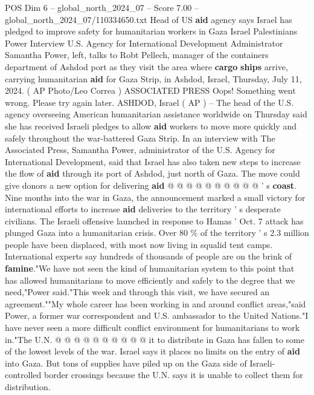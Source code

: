 \begin{textsample}{POS Dim 6 – global\_north\_2024\_07 – Score 7.00 – global\_north\_2024\_07/110334650.txt}  \label{ex:f6_pos_306}
Head of US \textbf{aid} agency says Israel has pledged to improve safety for humanitarian workers in Gaza Israel Palestinians Power Interview U.S.
Agency for International Development Administrator Samantha Power, left, talks to Robt Pellech, manager of the containers department of Ashdod port as they visit the area where \textbf{cargo} \textbf{ships} arrive, carrying humanitarian \textbf{aid} for Gaza Strip, in Ashdod, Israel, Thursday, July 11, 2024. ( AP Photo/Leo Correa ) ASSOCIATED PRESS Oops!
Something went wrong.
Please try again later.
ASHDOD, Israel ( AP ) -- The head of the U.S. agency overseeing American humanitarian assistance worldwide on Thursday said she has received Israeli pledges to allow \textbf{aid} workers to move more quickly and safely throughout the war-battered Gaza Strip.
In an interview with The Associated Press, Samantha Power, administrator of the U.S.
Agency for International Development, said that Israel has also taken new steps to increase the flow of \textbf{aid} through its port of Ashdod, just north of Gaza.
The move could give donors a new option for delivering \textbf{aid} @ @ @ @ @ @ @ @ @ @ ' s \textbf{coast}.
Nine months into the war in Gaza, the announcement marked a small victory for international efforts to increase \textbf{aid} deliveries to the territory ' s desperate civilians.
The Israeli offensive launched in response to Hamas ' Oct. 7 attack has plunged Gaza into a humanitarian crisis.
Over 80 \% of the territory ' s 2.3 million people have been displaced, with most now living in squalid tent camps.
International experts say hundreds of thousands of people are on the brink of \textbf{famine}."We have not seen the kind of humanitarian system to this point that has allowed humanitarians to move efficiently and safely to the degree that we need,"Power said."This week and through this visit, we have secured an agreement.""My whole career has been working in and around conflict areas,"said Power, a former war correspondent and U.S. ambassador to the United Nations."I have never seen a more difficult conflict environment for humanitarians to work in."The U.N. @ @ @ @ @ @ @ @ @ @ it to distribute in Gaza has fallen to some of the lowest levels of the war.
Israel says it places no limits on the entry of \textbf{aid} into Gaza.
But tons of supplies have piled up on the Gaza side of Israeli-controlled border crossings because the U.N. says it is unable to collect them for distribution.

\end{textsample}
